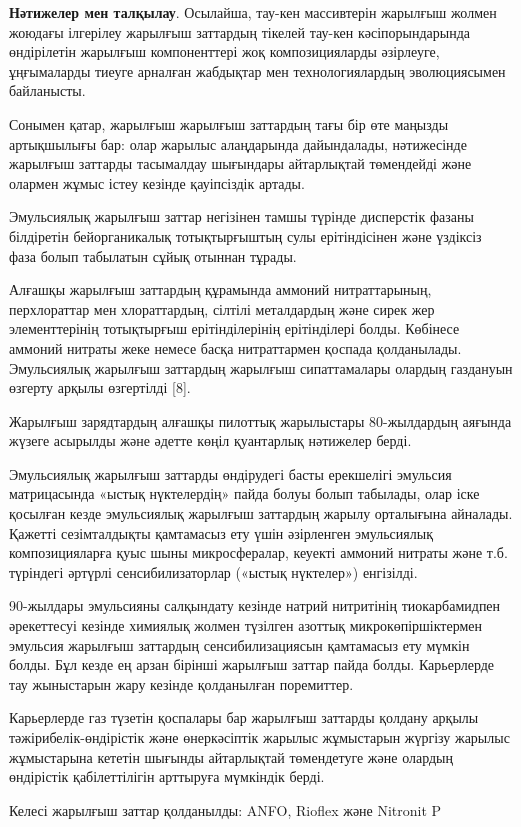 {\bfseries Нәтижелер мен талқылау}. Осылайша, тау-кен массивтерін жарылғыш
жолмен жоюдағы ілгерілеу жарылғыш заттардың тікелей тау-кен
кәсіпорындарында өндірілетін жарылғыш компоненттері жоқ композицияларды
әзірлеуге, ұңғымаларды тиеуге арналған жабдықтар мен технологиялардың
эволюциясымен байланысты.

Сонымен қатар, жарылғыш жарылғыш заттардың тағы бір өте маңызды
артықшылығы бар: олар жарылыс алаңдарында дайындалады, нәтижесінде
жарылғыш заттарды тасымалдау шығындары айтарлықтай төмендейді және
олармен жұмыс істеу кезінде қауіпсіздік артады.

Эмульсиялық жарылғыш заттар негізінен тамшы түрінде дисперстік фазаны
білдіретін бейорганикалық тотықтырғыштың сулы ерітіндісінен және
үздіксіз фаза болып табылатын сұйық отыннан тұрады.

Алғашқы жарылғыш заттардың құрамында аммоний нитраттарының, перхлораттар
мен хлораттардың, сілтілі металдардың және сирек жер элементтерінің
тотықтырғыш ерітінділерінің ерітінділері болды. Көбінесе аммоний нитраты
жеке немесе басқа нитраттармен қоспада қолданылады. Эмульсиялық жарылғыш
заттардың жарылғыш сипаттамалары олардың газдануын өзгерту арқылы
өзгертілді {[}8{]}.

Жарылғыш зарядтардың алғашқы пилоттық жарылыстары 80-жылдардың аяғында
жүзеге асырылды және әдетте көңіл қуантарлық нәтижелер берді.

Эмульсиялық жарылғыш заттарды өндірудегі басты ерекшелігі эмульсия
матрицасында «ыстық нүктелердің» пайда болуы болып табылады, олар іске
қосылған кезде эмульсиялық жарылғыш заттардың жарылу орталығына
айналады. Қажетті сезімталдықты қамтамасыз ету үшін әзірленген
эмульсиялық композицияларға қуыс шыны микросфералар, кеуекті аммоний
нитраты және т.б. түріндегі әртүрлі сенсибилизаторлар («ыстық нүктелер»)
енгізілді.

90-жылдары эмульсияны салқындату кезінде натрий нитритінің
тиокарбамидпен әрекеттесуі кезінде химиялық жолмен түзілген азоттық
микрокөпіршіктермен эмульсия жарылғыш заттардың сенсибилизациясын
қамтамасыз ету мүмкін болды. Бұл кезде ең арзан бірінші жарылғыш заттар
пайда болды. Карьерлерде тау жыныстарын жару кезінде қолданылған
поремиттер.

Карьерлерде газ түзетін қоспалары бар жарылғыш заттарды қолдану арқылы
тәжірибелік-өндірістік және өнеркәсіптік жарылыс жұмыстарын жүргізу
жарылыс жұмыстарына кететін шығынды айтарлықтай төмендетуге және олардың
өндірістік қабілеттілігін арттыруға мүмкіндік берді.

Келесі жарылғыш заттар қолданылды: ANFO, Rioflex және Nitronit P

